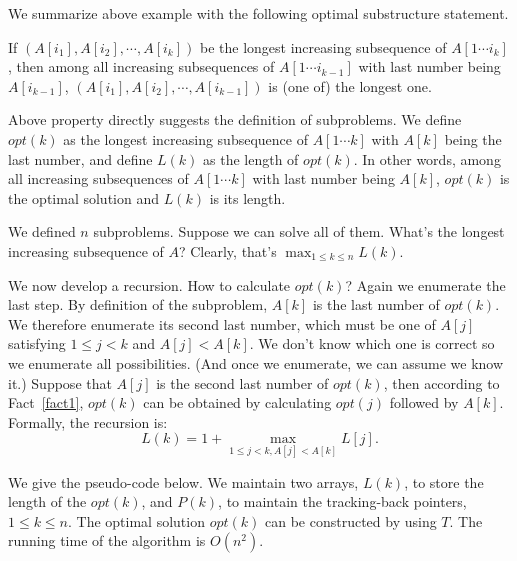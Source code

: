 We summarize above example with the following optimal substructure statement.
\begin{fact}\label{fact1}
If $(A[i_1], A[i_2], \cdots, A[i_k])$ be the longest increasing subsequence of $A[1\cdots i_k]$,
then among all increasing subsequences of $A[1\cdots i_{k-1}]$ with last number being $A[i_{k-1}]$,
$(A[i_1], A[i_2], \cdots, A[i_{k-1}])$ is (one of) the longest one. 
\end{fact}

Above property directly suggests the definition of subproblems.
We define $opt(k)$ as the longest increasing subsequence
of $A[1\cdots k]$ with $A[k]$ being the last number,
and define $L(k)$ as the length of $opt(k)$.
In other words, among all increasing subsequences of $A[1\cdots k]$ with last number being $A[k]$,
$opt(k)$ is the optimal solution and $L(k)$ is its length.

We defined $n$ subproblems. Suppose we can solve all of them.
What's the longest increasing subsequence of $A$?
Clearly, that's $\max_{1\le k \le n} L(k)$.

We now develop a recursion. 
How to calculate $opt(k)$?
Again we enumerate the last step. By definition of the subproblem, $A[k]$ is the last number of $opt(k)$.
We therefore enumerate its second last number, which must be one of $A[j]$ satisfying $1\le j < k$ and $A[j] < A[k]$.
We don't know which one is correct so we enumerate all possibilities.
(And once we enumerate, we can assume we know it.)
Suppose that $A[j]$ is the second last number of $opt(k)$, then according to Fact~\ref{fact1},
$opt(k)$ can be obtained by calculating $opt(j)$ followed by $A[k]$.
Formally, the recursion is:
$$\textstyle L(k) = 1 + \max_{1 \le j < k, A[j] < A[k]} L[j].$$

We give the pseudo-code below.
We maintain two arrays, $L(k)$, to store the length of the $opt(k)$,
and $P(k)$, to maintain the tracking-back pointers, $1 \le k \le n$.
The optimal solution $opt(k)$ can be constructed by using $T$.
The running time of the algorithm is $O(n^2)$.

\begin{minipage}{0.8\textwidth}
	\xxx
	\xxx
	\xxx
	\xxx
	\xxx
	\xxx
	\xxx
	\xxx
	\xxx
	\xxx
	\xxx
	\xxx
	\xxx
\end{minipage}

